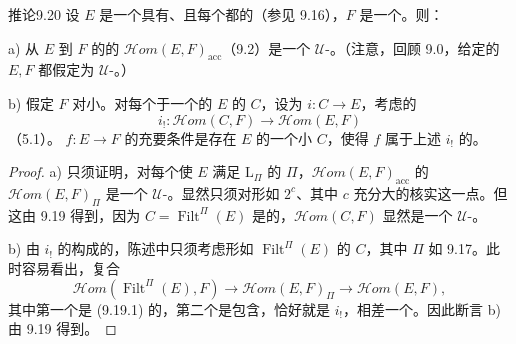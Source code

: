 \begin{SGAresult}{推论}{9.20}
设 $E$ 是一个具有、且每个都的（参见 9.16），$F$ 是一个。则：

a) 从 $E$ 到 $F$ 的的 $\mathscr{H}om(E,F)_{\mathrm{acc}}$（9.2）是一个 $\mathcal U$-。（注意，回顾 9.0，给定的 $E,F$ 都假定为 $\mathcal U$-。）

b) 假定 $F$ 对小。对每个于一个的 $E$ 的 $C$，设为 $i:C\to E$，考虑的
\[
i_!:\mathscr{H}om(C,F)\longrightarrow\mathscr{H}om(E,F)
\]
（5.1）。 $f:E\to F$ 的充要条件是存在 $E$ 的一个小 $C$，使得 $f$ 属于上述 $i_!$ 的。
\end{SGAresult}
\begin{proof}
a) 只须证明，对每个使 $E$ 满足 $\mathrm L_\Pi$ 的 $\Pi$，$\mathscr{H}om(E,F)_{\mathrm{acc}}$ 的 $\mathscr{H}om(E,F)_\Pi$ 是一个 $\mathcal U$-。显然只须对形如 $2^c$、其中 $c$ 充分大的核实这一点。但这由 9.19 得到，因为 $C=\operatorname{Filt}^\Pi(E)$ 是的，$\mathscr{H}om(C,F)$ 显然是一个 $\mathcal U$-。

b) 由 $i_!$ 的构成的，陈述中只须考虑形如 $\operatorname{Filt}^\Pi(E)$ 的 $C$，其中 $\Pi$ 如 9.17。此时容易看出，复合
\[
\mathscr{H}om(\operatorname{Filt}^\Pi(E),F)
\longrightarrow\mathscr{H}om(E,F)_\Pi
\longrightarrow\mathscr{H}om(E,F),
\]
其中第一个是 (9.19.1) 的，第二个是包含，恰好就是 $i_!$，相差一个。因此断言 b) 由 9.19 得到。
\end{proof}

